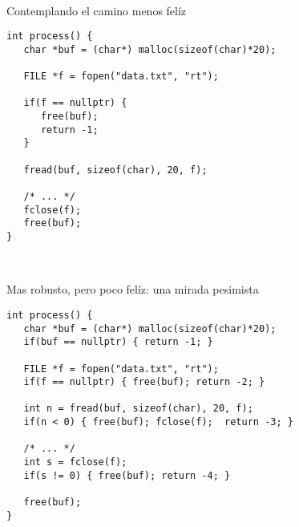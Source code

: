 ~%
\begin{frame}[fragile]{Contemplando el camino menos fel\'iz}
   \begin{lstlisting}[style=normal]
int process() {
   char *buf = (char*) malloc(sizeof(char)*20);

   FILE *f = fopen("data.txt", "rt");

   if(f == nullptr) {
      free(buf);
      return -1;
   }

   fread(buf, sizeof(char), 20, f);

   /* ... */
   fclose(f);
   free(buf);
}
   \end{lstlisting}
\end{frame}
~%

\begin{frame}[fragile]{Mas robusto, pero poco fel\'iz: una mirada pesimista}
   \begin{lstlisting}[style=normal]
int process() {
   char *buf = (char*) malloc(sizeof(char)*20);
   if(buf == nullptr) { return -1; }

   FILE *f = fopen("data.txt", "rt");
   if(f == nullptr) { free(buf); return -2; }

   int n = fread(buf, sizeof(char), 20, f);
   if(n < 0) { free(buf); fclose(f);  return -3; }

   /* ... */
   int s = fclose(f);
   if(s != 0) { free(buf); return -4; }

   free(buf);
}
   \end{lstlisting}
\end{frame}

